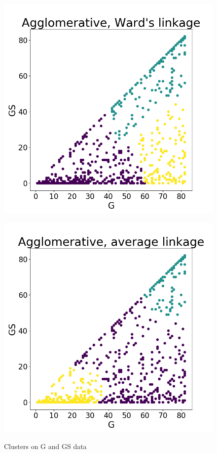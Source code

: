 \documentclass[a4paper]{article}
\begin{document}
\begin{figure}
\begin{minipage}{.22\textwidth}
  \label{fig:complete_g_gs}
\end{minipage}
\begin{minipage}{.22\textwidth}
  \centering
  \includegraphics[scale=0.14]{ward_link_g_gs.png}
  \label{fig:ward_g_gs}
\end{minipage}
\begin{minipage}{.22\textwidth}
  \centering
  \includegraphics[scale=0.14]{average_link_g_gs.png}
  \label{fig:average_g_gs}
\end{minipage}
\caption{Clusters on G and GS data}
\label{plt:clust_g_gs_k3}
\end{figure}
\end{document}
